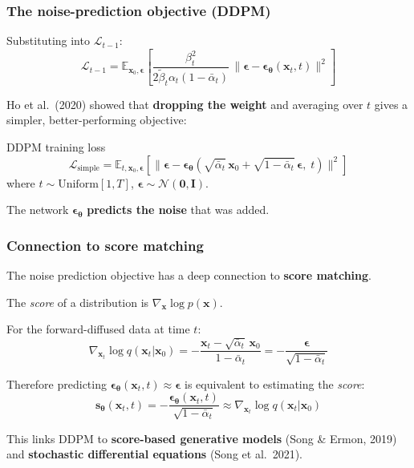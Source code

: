 \documentclass{beamer}
\newcommand{\E}{\mathbb{E}}
\newcommand{\Norm}{\mathcal{N}}
\begin{document}
\begin{frame}
\frametitle{The noise-prediction objective (DDPM)}

Substituting into $\mathcal{L}_{t-1}$:
\[
  \mathcal{L}_{t-1}
  = \E_{\bm{x}_0,\bm{\epsilon}}\!\left[
    \frac{\beta_t^2}{2\tilde\beta_t\alpha_t(1-\bar\alpha_t)}\,
    \bigl\|\bm{\epsilon} - \bm{\epsilon}_{\bm{\theta}}(\bm{x}_t,t)\bigr\|^2
  \right]
\]

Ho et al.\ (2020) showed that \textbf{dropping the weight} and averaging
over $t$ gives a simpler, better-performing objective:

\begin{block}{DDPM training loss}
\[
\boxed{
\mathcal{L}_{\mathrm{simple}}
= \E_{t,\bm{x}_0,\bm{\epsilon}}\!\left[
  \bigl\|\bm{\epsilon}
         - \bm{\epsilon}_{\bm{\theta}}(\sqrt{\bar\alpha_t}\,\bm{x}_0
           + \sqrt{1-\bar\alpha_t}\,\bm{\epsilon},\;t)\bigr\|^2
\right]
}
\]
where $t\sim\mathrm{Uniform}[1,T]$, $\bm{\epsilon}\sim\Norm(\bm{0},\mathbf{I})$.
\end{block}

The network $\bm{\epsilon}_{\bm{\theta}}$ \textbf{predicts the noise} that was added.
\end{frame}

\begin{frame}
\frametitle{Connection to score matching}

The noise prediction objective has a deep connection to \textbf{score matching}.

The \emph{score} of a distribution is $\nabla_{\bm{x}}\log p(\bm{x})$.

For the forward-diffused data at time $t$:
\[
  \nabla_{\bm{x}_t}\log q(\bm{x}_t|\bm{x}_0)
  = -\frac{\bm{x}_t - \sqrt{\bar\alpha_t}\,\bm{x}_0}{1-\bar\alpha_t}
  = -\frac{\bm{\epsilon}}{\sqrt{1-\bar\alpha_t}}
\]

Therefore predicting $\bm{\epsilon}_{\bm{\theta}}(\bm{x}_t,t)\approx\bm{\epsilon}$
is equivalent to estimating the \emph{score}:
\[
  \bm{s}_{\bm{\theta}}(\bm{x}_t,t)
  = -\frac{\bm{\epsilon}_{\bm{\theta}}(\bm{x}_t,t)}{\sqrt{1-\bar\alpha_t}}
  \approx \nabla_{\bm{x}_t}\log q(\bm{x}_t|\bm{x}_0)
\]

This links DDPM to \textbf{score-based generative models}
(Song \& Ermon, 2019) and \textbf{stochastic differential equations}
(Song et al.\ 2021).
\end{frame}
\end{document}
